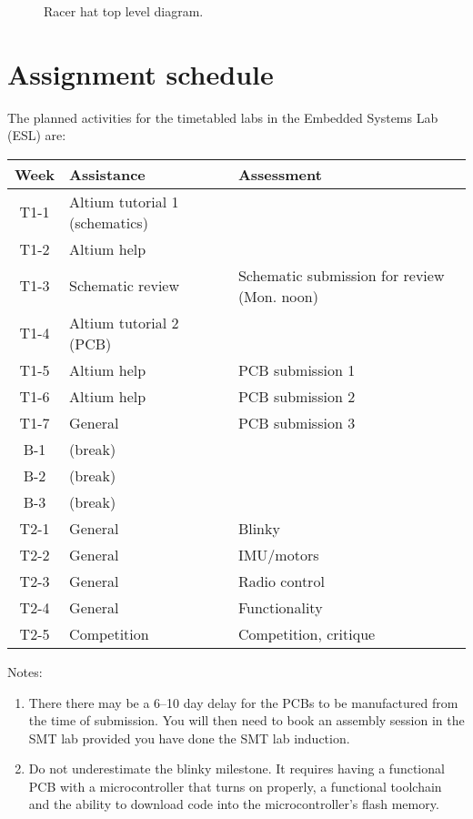 \documentclass[11pt, a4paper]{article}
\begin{document}
\begin{figure}[h]
  \centering
  
  \caption{Racer hat top level diagram.}
\end{figure}


\pagebreak

\section{Assignment schedule}

The planned activities for the timetabled labs in the Embedded Systems
Lab (ESL) are:
%
\begin{flushleft}
  \begin{tabular}{ c l l }
    Week            &  Assistance  &  Assessment \\
    \hline \hline
    T1-1 & Altium tutorial 1 (schematics)  & \\
    T1-2 & Altium help       & \\
    T1-3 & Schematic review  &  Schematic submission for review (Mon. noon) \\
    T1-4 & Altium tutorial 2 (PCB) &          \\
    T1-5 & Altium help & PCB submission 1    \\
    T1-6 & Altium help & PCB submission 2    \\
    T1-7 & General     & PCB submission 3    \\ \hline
    B-1 & (break)    &                   \\
    B-2 & (break)    &                   \\
    B-3 & (break)    &                   \\ \hline
    T2-1 & General     & Blinky            \\
    T2-2 & General     & IMU/motors      \\
    T2-3 & General     & Radio control     \\    
    T2-4 & General     & Functionality     \\
    T2-5 & Competition & Competition, critique  \\
  \end{tabular}
\end{flushleft}


Notes:
%
\begin{enumerate}
\item There there may be a 6--10 day delay for the PCBs to be
  manufactured from the time of submission.  You will then need to
  book an assembly session in the SMT lab provided you have done the
  SMT lab induction.

\item Do not underestimate the blinky milestone.  It requires having a
  functional PCB with a microcontroller that turns on properly, a
  functional toolchain and the ability to download code into the
  microcontroller's flash memory.
\end{enumerate}
\end{document}
